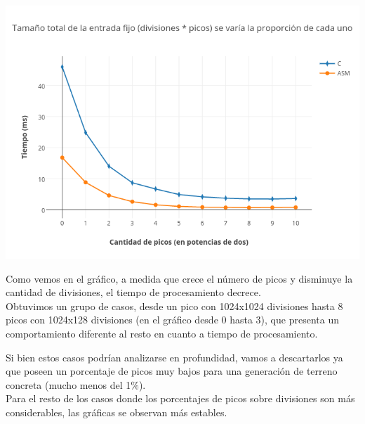 \includegraphics[scale=0.6]{imagenes/tamanioTotalFijo.png} 

Como vemos en el gráfico, a medida que crece el número de picos y disminuye la cantidad de divisiones, el tiempo de procesamiento decrece.\\

Obtuvimos un grupo de casos, desde un pico con 1024x1024 divisiones hasta 8 picos con 1024x128 divisiones (en el gráfico desde 0 hasta 3), que presenta un comportamiento diferente al resto en cuanto a tiempo de procesamiento.

Si bien estos casos podrían analizarse en profundidad, vamos a descartarlos ya que poseen un porcentaje de picos muy bajos para una generación de terreno concreta (mucho menos del 1$\%$).\\

Para el resto de los casos donde los porcentajes de picos sobre divisiones son más considerables, las gráficas se observan más estables.